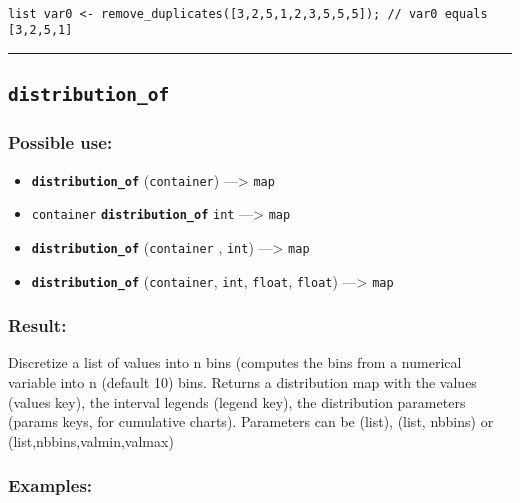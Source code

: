 \documentclass[]{book}
\providecommand{\tightlist}{%
  \setlength{\itemsep}{0pt}\setlength{\parskip}{0pt}}
\theoremstyle{definition}
\theoremstyle{definition}
\theoremstyle{definition}
\theoremstyle{remark}
\begin{document}
\begin{verbatim}
 
list var0 <- remove_duplicates([3,2,5,1,2,3,5,5,5]); // var0 equals [3,2,5,1]
\end{verbatim}

\begin{center}\rule{0.5\linewidth}{\linethickness}\end{center}

\subsection{\texorpdfstring{\texttt{distribution\_of}}{distribution\_of}}\label{distribution_of}

\subsubsection{Possible use:}\label{possible-use-138}

\begin{itemize}
\tightlist
\item
  \textbf{\texttt{distribution\_of}} (\texttt{container})
  ---\textgreater{} \texttt{map}
\item
  \texttt{container} \textbf{\texttt{distribution\_of}} \texttt{int}
  ---\textgreater{} \texttt{map}
\item
  \textbf{\texttt{distribution\_of}} (\texttt{container} , \texttt{int})
  ---\textgreater{} \texttt{map}
\item
  \textbf{\texttt{distribution\_of}} (\texttt{container}, \texttt{int},
  \texttt{float}, \texttt{float}) ---\textgreater{} \texttt{map}
\end{itemize}

\subsubsection{Result:}\label{result-134}

Discretize a list of values into n bins (computes the bins from a
numerical variable into n (default 10) bins. Returns a distribution map
with the values (values key), the interval legends (legend key), the
distribution parameters (params keys, for cumulative charts). Parameters
can be (list), (list, nbbins) or (list,nbbins,valmin,valmax)

\subsubsection{Examples:}\label{examples-105}
\end{document}
